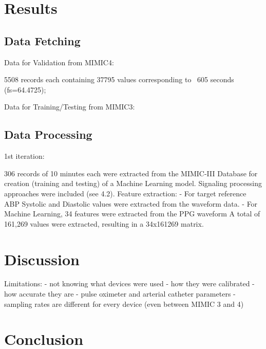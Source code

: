 \documentclass[12pt, bibliography=totoc]{scrartcl}
\begin{document}
\section{Results}
\label{sec:results}

\subsection{Data Fetching}
\label{subsec:data_fetching}

Data for Validation from MIMIC4:

5508 records each containing 37795 values corresponding to ~605 seconds (fs=64.4725);

Data for Training/Testing from MIMIC3:

\subsection{Data Processing}
\label{subsec:data_processing}

1st iteration:

306 records of 10 minutes each were extracted from the MIMIC-III Database for creation (training and testing) of a Machine Learning model.
Signaling processing approaches were included (see 4.2).
Feature extraction:
- For target reference ABP Systolic and Diastolic values were extracted from the waveform data.
- For Machine Learning, 34 features were extracted from the PPG waveform
A total of 161,269 values were extracted, resulting in a 34x161269 matrix.


\section{Discussion}
\label{sec:discussion}

Limitations:
- not knowing what devices were used
- how they were calibrated
- how accurate they are
- pulse oximeter and arterial catheter parameters
- sampling rates are different for every device (even between MIMIC 3 and 4)

\section{Conclusion}
\label{sec:conclusion}



\end{document}
